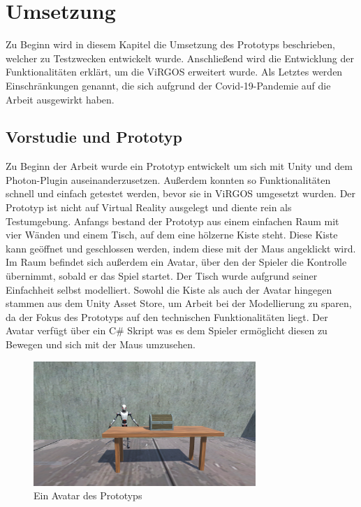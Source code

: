 \section{Umsetzung} \label{Umsetzung}
Zu Beginn wird in diesem Kapitel die Umsetzung des Prototyps beschrieben, welcher zu Testzwecken entwickelt wurde. Anschließend wird die Entwicklung der Funktionalitäten erklärt, um die ViRGOS erweitert wurde. Als Letztes werden Einschränkungen genannt, die sich aufgrund der Covid-19-Pandemie auf die Arbeit ausgewirkt haben.

\subsection{Vorstudie und Prototyp} \label{Vorstudie}
Zu Beginn der Arbeit wurde ein Prototyp entwickelt um sich mit Unity und dem Photon-Plugin auseinanderzusetzen. Außerdem konnten so Funktionalitäten schnell und einfach getestet werden, bevor sie in ViRGOS umgesetzt wurden. Der Prototyp ist nicht auf Virtual Reality ausgelegt und diente rein als Testumgebung. Anfangs bestand der Prototyp aus einem einfachen Raum mit vier Wänden und einem Tisch, auf dem eine hölzerne Kiste steht. Diese Kiste kann geöffnet und geschlossen werden, indem diese mit der Maus angeklickt wird. Im Raum befindet sich außerdem ein Avatar, über den der Spieler die Kontrolle übernimmt, sobald er das Spiel startet. Der Tisch wurde aufgrund seiner Einfachheit selbst modelliert. Sowohl die Kiste als auch der Avatar hingegen stammen aus dem Unity Asset Store, um Arbeit bei der Modellierung zu sparen, da der Fokus des Prototyps auf den technischen Funktionalitäten liegt. Der Avatar verfügt über ein C\# Skript was es dem Spieler ermöglicht diesen zu Bewegen und sich mit der Maus umzusehen.\\

\begin{figure}[H]
\centering
\includegraphics[width=0.75\textwidth]{InteractivityPrototype.PNG}
\caption{Ein Avatar des Prototyps}
\end{figure}

